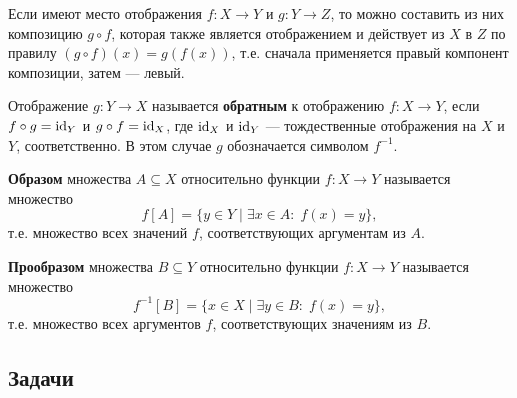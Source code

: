 Если имеют место отображения $f: X \to Y$ и $g: Y \to Z$, то можно составить
из них композицию $g \circ f$, которая также является отображением и действует
из $X$ в $Z$ по правилу $(g \circ f)(x) = g(f(x))$, т.е. сначала применяется правый компонент композиции, затем --- левый.

Отображение $g:Y\to X$ называется \textbf{обратным} к отображению $f:X\to Y$, если $f\circ g=\mathrm{id}_Y$ и $g\circ f=\mathrm{id}_X$, где $\mathrm{id}_X$ и $\mathrm{id}_Y$ --- тождественные отображения на $X$ и $Y$, соответственно. В этом случае $g$ обозначается символом $f^{-1}$.

\textbf{Образом} множества $A\subseteq X$ относительно функции $f:X\to Y$ называется множество
$$
f[A] = \{y\in Y\mid \exists x\in A:\;f(x)=y\},
$$
т.е. множество всех значений $f$, соответствующих аргументам из $A$.

\textbf{Прообразом} множества $B\subseteq Y$ относительно функции $f:X\to Y$ называется множество
$$
f^{-1}[B] = \{x\in X\mid \exists y\in B:\;f(x)=y\},
$$
т.е. множество всех аргументов $f$, соответствующих значениям из $B$.




\subsection*{Задачи}

